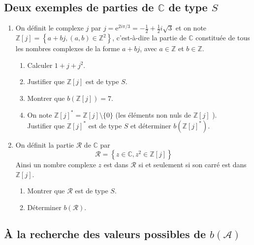 \documentclass[landscape,twocolumn,leqno,a4paper,10pt]{report} %
\newcommand{\e}{\mathrm{e}}
\begin{document}
\subsection{Deux exemples de parties de $\mathbb{C}$ de type $S$}


\begin{enumerate}
	\item On définit le complexe $j$ par $j=\e^{2 i \pi / 3}=-\frac{1}{2}+\frac{1}{2} i \sqrt{3}$ et on note $\mathbb{Z}[j]=\left\{a+b j,(a, b) \in \mathbb{Z}^{2}\right\}$, c'est-à-dire la partie de $\mathbb{C}$ constituée de tous les nombres complexes de la forme $a+b j$, avec $a \in \mathbb{Z}$ et $b \in \mathbb{Z}$.
	\begin{enumerate}
		\item Calculer $1+j+j^{2}$.
		\item Justifier que $\mathbb{Z}[j]$ est de type $S$.
		\item Montrer que $b(\mathbb{Z}[j])=7$.
		\item On note $\mathbb{Z}[j]^{*}=\mathbb{Z}[j] \setminus\{0\}$ (les éléments non nuls de $\mathbb{Z}[j]$ ).\\
		Justifier que $\mathbb{Z}[j]^{*}$ est de type $S$ et déterminer $b\left(\mathbb{Z}[j]^{*}\right)$.
	\end{enumerate}
	\item On définit la partie $\mathscr{R}$ de $\mathbb{C}$ par
	$$\mathscr{R}=\left\{z \in \mathbb{C}, z^{2} \in \mathbb{Z}[j]\right\}$$
	Ainsi un nombre complexe $z$ est dans $\mathscr{R}$ si et seulement si son carré est dans $\mathbb{Z}[j]$.
	\begin{enumerate}
		\item Montrer que $\mathscr{R}$ est de type $S$.
		\item Déterminer $b(\mathscr{R})$.
	\end{enumerate}
\end{enumerate}

\subsection{À la recherche des valeurs possibles de $b(\mathscr{A})$}
\end{document}
